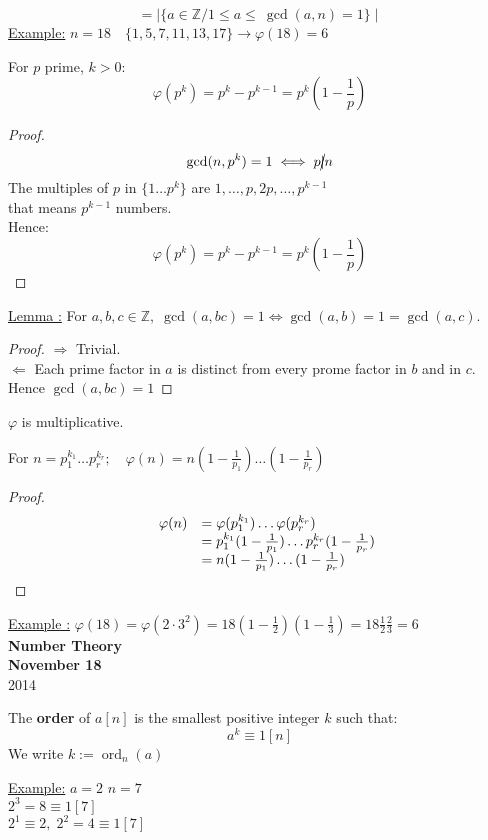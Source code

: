 \documentclass{report}
\DeclareMathOperator{\ord}{ord}
\begin{document}
													\[=\mid \{ a \in \mathbb{Z}/ 1 \leq a \leq \: \gcd(a,n)=1 \} \mid \]
\underline{Example:} $n= 18 \quad \{1,5,7,11,13,17\} \rightarrow \varphi(18)=6$\\
\begin{thm}
				For $p$ prime, $k>0$:
															\[\varphi(p^k)=p^k-p^{k-1}=p^k(1-\frac{1}{p})\]
\end{thm}
\begin{proof}
				\[\gcd(n,p^k)=1 \iff p \cancel{\mid} n\]
				The multiples of $p$ in $\{1 \dots p^k\}$ are $1,\dots, p, 2p, \dots,p^{k-1}$\\
				that means $p^{k-1}$ numbers.\\
				Hence: \[\varphi(p^k) =p^k-p^{k-1}=p^k(1-\frac{1}{p})\]
\end{proof}
\underline{Lemma :} For $a,b,c \in \mathbb{Z},\; \gcd(a,bc)=1 \iff \gcd(a,b)=1=\gcd(a,c)$.
\begin{proof}
		\underline{$\Rightarrow$} Trivial.\\
		\underline{$\Leftarrow$} Each prime factor in $a$ is distinct from every prome factor in $b$ and in $c$. Hence $\gcd(a,bc)=1$
\end{proof}
\begin{thm} $\varphi$ is multiplicative.
\end{thm}
\begin{thm}
				For $n=p_1^{k_1}\dots p_r^{k_r} ;\quad \varphi(n)=n(1-\frac{1}{p_1})\dots(1-\frac{1}{p_r})$
\end{thm}
\begin{proof}
					\[ 	\begin{array}{l c l}
							&\varphi(n)&=\varphi(p_1^{k_1})\dots\varphi(p_r^{k_r})\\
							&&=p_1^{k_1}(1-\frac{1}{p_1})\dots p_r^{k_r}(1-\frac{1}{p_r})\\
							&&=n(1-\frac{1}{p_1})\dots (1-\frac{1}{p_r})\\
							\end{array}
					\]
\end{proof}
\underline{Example :} $\varphi(18)=\varphi(2 \cdot 3^2)=18(1-\frac{1}{2})(1-\frac{1}{3}) = 18 \frac{1}{2} \frac{2}{3}=6$\\
\newpage
{\centering
\Large
\textbf{Number Theory}\\
\normalsize
\textbf{November 18}\\
2014\\
}
\vspace{10mm}
\begin{defi} The \textbf{order} of $a[n]$ is the smallest positive integer $k$ such that:
																\[ a^k \equiv 1 [n] \]
						We write $k:= \ord_n(a)$
\end{defi}
\underline{Example:} $a=2$ $n=7$\\
	$2^3=8 \equiv 1 [7]$\\
	$2^1 \equiv 2, \; 2^2=4\equiv 1 [7]$\\
\end{document}
